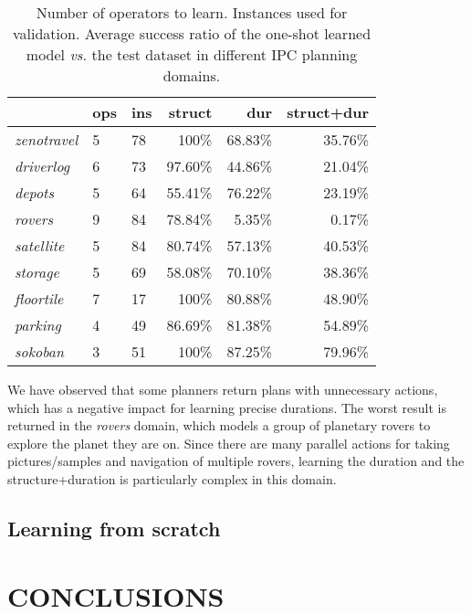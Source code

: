 \documentclass{ecai}
\begin{document}
\begin{table}
\begin{center}
\caption{Number of operators to learn. Instances used for validation. Average success ratio of the one-shot learned model \emph{vs.} the test dataset in different IPC planning domains.}
\begin{scriptsize}
\begin{tabular}{l|llrrr}
\hline	
& {\bf ops} & {\bf ins} & {\bf struct} & {\bf dur} & {\bf struct+dur}  \\\hline

\emph{zenotravel} & 5 & 78 & 100\% & 68.83\% & 35.76\% \\
\emph{driverlog} & 6 & 73 & 97.60\% & 44.86\% & 21.04\% \\
\emph{depots} & 5 & 64 & 55.41\% & 76.22\% & 23.19\% \\
\emph{rovers} & 9 & 84 & 78.84\% & 5.35\% & 0.17\% \\
\emph{satellite} & 5 & 84 & 80.74\% & 57.13\% & 40.53\% \\
\emph{storage} & 5 & 69 & 58.08\% & 70.10\% & 38.36\% \\
\emph{floortile} & 7 & 17 & 100\% & 80.88\% & 48.90\%\\
\emph{parking} & 4 & 49 & 86.69\% & 81.38\% & 54.89\% \\
\emph{sokoban} & 3 & 51 & 100\% & 87.25\% & 79.96\% \\

\end{tabular}
\end{scriptsize}
\label{table:evaluationExperiments}
\end{center}
\end{table}


We have observed that some planners return plans with unnecessary actions, which has a negative impact for learning precise durations.
The worst result is returned in the \emph{rovers} domain, which models a group of planetary rovers to explore the planet they are on. Since there are many parallel actions for taking pictures/samples and navigation of multiple rovers, learning the duration and the structure+duration is particularly complex in this domain.

\subsection{Learning from scratch}

\section{CONCLUSIONS}
\label{sec:conclusions}







\end{document}
